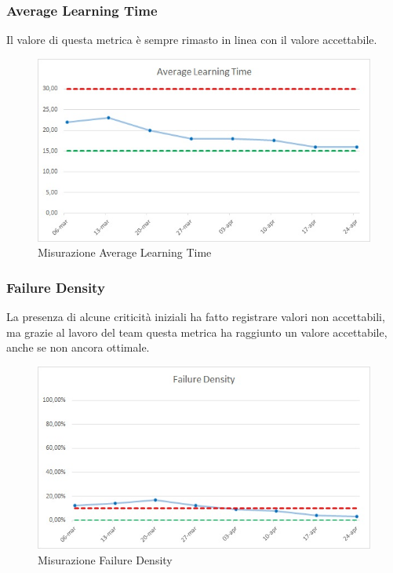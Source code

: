 \subsubsection{Average Learning Time}
Il valore di questa metrica è sempre rimasto in linea con il valore accettabile.
\begin{figure} [H]
	\centering
	\includegraphics[scale=1]{Img/ALT}
	\caption{Misurazione Average Learning Time}\label{}
\end{figure}

\subsubsection{Failure Density}
La presenza di alcune criticità iniziali ha fatto registrare valori non accettabili, ma grazie al lavoro del team questa metrica ha raggiunto un valore accettabile, anche se non ancora ottimale.
\begin{figure} [H]
	\centering
	\includegraphics[scale=1]{Img/FD}
	\caption{Misurazione Failure Density}\label{}
\end{figure}

